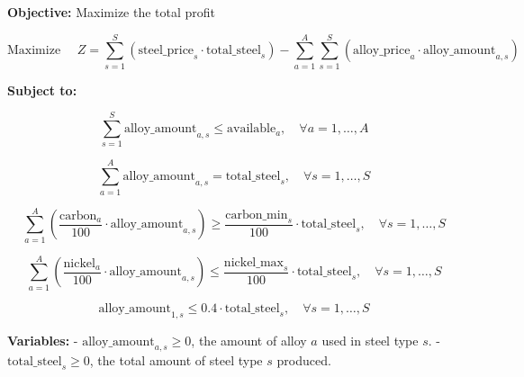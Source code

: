 \documentclass{article}
\begin{document}
\textbf{Objective:} Maximize the total profit

\[
\text{Maximize } \quad Z = \sum_{s=1}^{S} \left( \text{steel\_price}_{s} \cdot \text{total\_steel}_{s} \right) - \sum_{a=1}^{A} \sum_{s=1}^{S} \left( \text{alloy\_price}_{a} \cdot \text{alloy\_amount}_{a,s} \right)
\]

\textbf{Subject to:}

\[
\sum_{s=1}^{S} \text{alloy\_amount}_{a,s} \leq \text{available}_{a}, \quad \forall a = 1, \ldots, A
\]

\[
\sum_{a=1}^{A} \text{alloy\_amount}_{a,s} = \text{total\_steel}_{s}, \quad \forall s = 1, \ldots, S
\]

\[
\sum_{a=1}^{A} \left( \frac{\text{carbon}_{a}}{100} \cdot \text{alloy\_amount}_{a,s} \right) \geq \frac{\text{carbon\_min}_{s}}{100} \cdot \text{total\_steel}_{s}, \quad \forall s = 1, \ldots, S
\]

\[
\sum_{a=1}^{A} \left( \frac{\text{nickel}_{a}}{100} \cdot \text{alloy\_amount}_{a,s} \right) \leq \frac{\text{nickel\_max}_{s}}{100} \cdot \text{total\_steel}_{s}, \quad \forall s = 1, \ldots, S
\]

\[
\text{alloy\_amount}_{1,s} \leq 0.4 \cdot \text{total\_steel}_{s}, \quad \forall s = 1, \ldots, S
\]

\textbf{Variables:}
- \(\text{alloy\_amount}_{a,s} \geq 0\), the amount of alloy \(a\) used in steel type \(s\).
- \(\text{total\_steel}_{s} \geq 0\), the total amount of steel type \(s\) produced.
\end{document}
